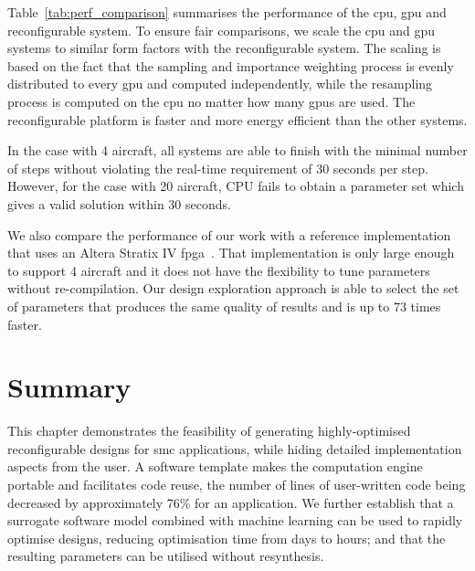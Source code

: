 Table~\ref{tab:perf_comparison} summarises the performance of the \gls{cpu}, \gls{gpu} and reconfigurable system.
To ensure fair comparisons, we scale the \gls{cpu} and \gls{gpu} systems to similar form factors with the reconfigurable system.
The scaling is based on the fact that the sampling and importance weighting process is evenly distributed to every \gls{gpu} and computed independently,
while the resampling process is computed on the \gls{cpu} no matter how many \gls{gpu}s are used.
The reconfigurable platform is faster and more energy efficient than the other systems.

In the case with 4 aircraft, all systems are able to finish with the minimal number of steps without violating the real-time requirement of 30 seconds per step.
However, for the case with 20 aircraft, CPU fails to obtain a parameter set which gives a valid solution within 30 seconds.

We also compare the performance of our work with a reference implementation that uses an Altera Stratix IV \gls{fpga}~\cite{chau13acm}.
That implementation is only large enough to support 4 aircraft and it does not have the flexibility to tune parameters without re-compilation.
Our design exploration approach is able to select the set of parameters that produces the same quality of results and is up to 73 times faster.



\section{Summary}
\label{sec:flow_summary}

This chapter demonstrates the feasibility of generating highly-optimised reconfigurable designs for \gls{smc} applications, while hiding detailed implementation aspects from the user.  
A software template makes the computation engine portable and facilitates code reuse, the number of lines of user-written code being decreased by approximately 76\% for an application.
We further establish that a surrogate software model combined with machine learning can be used to rapidly optimise designs, reducing optimisation time from days to hours; 
and that the resulting parameters can be utilised without resynthesis. 
